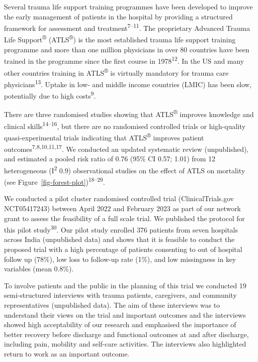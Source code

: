 \documentclass[
]{scrartcl}
\begin{document}
Several trauma life support training programmes have been developed to
improve the early management of patients in the hospital by providing a
structured framework for assessment and
treatment\textsuperscript{7--11}. The proprietary Advanced Trauma Life
Support\textsuperscript{®} (ATLS\textsuperscript{®}) is the most
established trauma life support training programme and more than one
million physicians in over 80 countries have been trained in the
programme since the first course in 1978\textsuperscript{12}. In the US
and many other countries training in ATLS\textsuperscript{®} is
virtually mandatory for trauma care physicians\textsuperscript{13}.
Uptake in low- and middle income countries (LMIC) has been slow,
potentially due to high costs\textsuperscript{9}.

There are three randomised studies showing that ATLS\textsuperscript{®}
improves knowledge and clinical skills\textsuperscript{14--16}, but
there are no randomised controlled trials or high-quality
quasi-experimental trials indicating that ATLS\textsuperscript{®}
improves patient outcomes\textsuperscript{7,8,10,11,17}. We conducted an
updated systematic review (unpublished), and estimated a pooled risk
ratio of 0.76 (95\% CI 0.57; 1.01) from 12 heterogeneous
(I\textsuperscript{2} 0.9) observational studies on the effect of ATLS
on mortality (see Figure~\ref{fig-forest-plot})\textsuperscript{18--29}.

We conducted a pilot cluster randomised controlled trial
(ClinicalTrials.gov NCT05417243) between April 2022 and February 2023 as
part of our network grant to assess the feasibility of a full scale
trial. We published the protocol for this pilot
study\textsuperscript{30}. Our pilot study enrolled 376 patients from
seven hospitals across India (unpublished data) and shows that it is
feasible to conduct the proposed trial with a high percentage of
patients consenting to out of hospital follow up (78\%), low loss to
follow-up rate (1\%), and low missingness in key variables (mean 0.8\%).

To involve patients and the public in the planning of this trial we
conducted 19 semi-structured interviews with trauma patients,
caregivers, and community representatives (unpublished data). The aim of
these interviews was to understand their views on the trial and
important outcomes and the interviews showed high acceptability of our
research and emphasised the importance of better recovery before
discharge and functional outcomes at and after discharge, including
pain, mobility and self-care activities. The interviews also highlighted
return to work as an important outcome.
\end{document}
